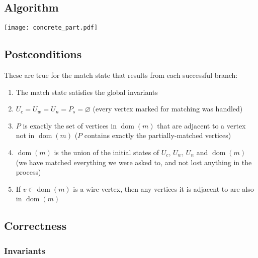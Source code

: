 \documentclass{article}
\DeclareMathOperator{\dom}{dom}
\begin{document}
\subsection{Algorithm}
\begin{center}
  \texttt{[image: concrete\_part.pdf]}
\end{center}

\subsection{Postconditions}
These are true for the match state that results from each successful branch:
\begin{enumerate}
  \renewcommand{\theenumi}{(\arabic{enumi})}
  \renewcommand{\labelenumi}{\theenumi}
  \item \label{enum:il-postcond-inv} The match state satisfies the global invariants
  \item \label{enum:il-postcond-no-unmatched} $U_c = U_w = U_n = P_s = \varnothing$ (every vertex marked for matching was handled)
  \item \label{enum:il-postcond-P} $P$ is exactly the set of vertices in $\dom(m)$ that are adjacent to a vertex not in $\dom(m)$ ($P$ contains exactly the partially-matched vertices)
  \item \label{enum:il-postcond-all-matched} $\dom(m)$ is the union of the initial states of $U_c$, $U_w$, $U_n$ and $\dom(m)$ (we have matched everything we were asked to, and not lost anything in the process)
  \item \label{enum:il-postcond-wire-connected} If $v \in \dom(m)$ is a wire-vertex, then any vertices it is adjacent to are also in $\dom(m)$
\end{enumerate}

\subsection{Correctness}

\subsubsection{Invariants}
\end{document}

